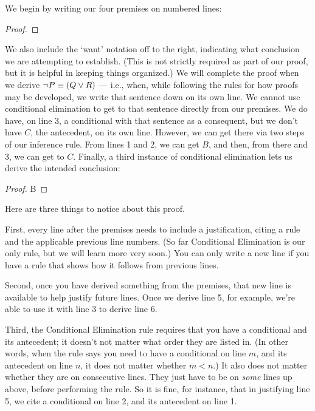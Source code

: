 We begin by writing our four premises on numbered lines:

\begin{proof}
	 
\end{proof}

We also include the `want' notation off to the right, indicating what conclusion we are attempting to establish. (This is not strictly required as part of our proof, but it is helpful in keeping things organized.) We will complete the proof when we derive $\neg P \equiv (Q \vee R)$ --- i.e., when, while following the rules for how proofs may be developed, we write that sentence down on its own line. We cannot use conditional elimination to get to that sentence directly from our premises. We do have, on line 3, a conditional with that sentence as a consequent, but we don't have $C$, the antecedent, on its own line. However, we can get there via two steps of our inference rule. From lines 1 and 2, we can get $B$, and then, from there and 3, we can get to $C$. Finally, a third instance of conditional elimination lets us derive the intended conclusion:

\begin{proof}
	 
	 {B} 
	 
	 
\end{proof}

Here are three things to notice about this proof.

First, every line after the premises needs to include a justification, citing a rule and the applicable previous line numbers. (So far Conditional Elimination is our only rule, but we will learn more very soon.) You can only write a new line if you have a rule that shows how it follows from previous lines.

Second, once you have derived something from the premises, that new line is available to help justify future lines. Once we derive line 5, for example, we're able to use it with line 3 to derive line 6.

Third, the Conditional Elimination rule requires that you have a conditional and its antecedent; it doesn't not matter what order they are listed in. (In other words, when the rule says you need to have a conditional on line $m$, and its antecedent on line $n$, it does not matter whether $m<n$.) It also does not matter whether they are on consecutive lines. They just have to be on \emph{some} lines up above, before performing the rule. So it is fine, for instance, that in justifying line 5, we cite a conditional on line 2, and its antecedent on line 1.

